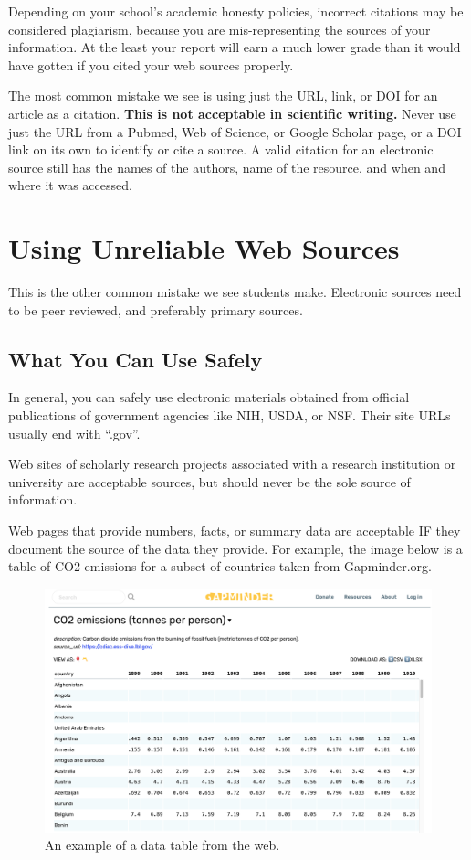\documentclass[
]{book}
\begin{document}
Depending on your school's academic honesty policies, incorrect citations may be considered plagiarism, because you are mis-representing the sources of your information. At the least your report will earn a much lower grade than it would have gotten if you cited your web sources properly.

The most common mistake we see is using just the URL, link, or DOI for an article as a citation. \textbf{This is not acceptable in scientific writing.} Never use just the URL from a Pubmed, Web of Science, or Google Scholar page, or a DOI link on its own to identify or cite a source. A valid citation for an electronic source still has the names of the authors, name of the resource, and when and where it was accessed.

\hypertarget{using-unreliable-web-sources}{%
\section{Using Unreliable Web Sources}\label{using-unreliable-web-sources}}

This is the other common mistake we see students make. Electronic sources need to be peer reviewed, and preferably primary sources.

\hypertarget{what-you-can-use-safely}{%
\subsection{What You Can Use Safely}\label{what-you-can-use-safely}}

In general, you can safely use electronic materials obtained from official publications of government agencies like NIH, USDA, or NSF. Their site URLs usually end with ``.gov''.

Web sites of scholarly research projects associated with a research institution or university are acceptable sources, but should never be the sole source of information.

Web pages that provide numbers, facts, or summary data are acceptable IF they document the source of the data they provide. For example, the image below is a table of CO2 emissions for a subset of countries taken from Gapminder.org.

\begin{figure}
\centering
\includegraphics{images/Web_data_documentation.png}
\caption{An example of a data table from the web.}
\end{figure}
\end{document}
